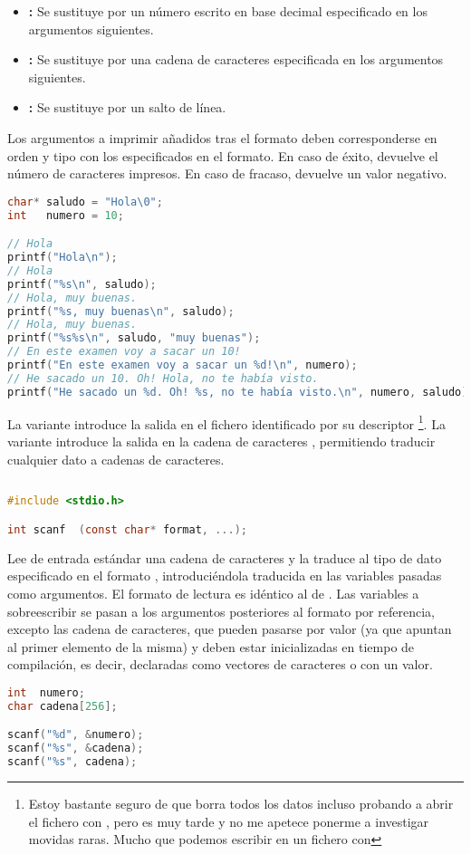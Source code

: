 \begin{itemize}
	\item{}\textbf{:} Se sustituye por un número escrito en base decimal especificado en los argumentos siguientes.
	\item{}\textbf{:} Se sustituye por una cadena de caracteres especificada en los argumentos siguientes.
	\item{}\textbf{:} Se sustituye por un salto de línea.
\end{itemize}

Los argumentos a imprimir añadidos tras el formato deben corresponderse en orden y tipo con los especificados en el formato.
En caso de éxito, devuelve el número de caracteres impresos.
En caso de fracaso, devuelve un valor negativo.

\begin{lstlisting}[language=C]
char* saludo = "Hola\0";
int   numero = 10;

// Hola
printf("Hola\n");
// Hola
printf("%s\n", saludo);
// Hola, muy buenas.
printf("%s, muy buenas\n", saludo);
// Hola, muy buenas.
printf("%s%s\n", saludo, "muy buenas");
// En este examen voy a sacar un 10!
printf("En este examen voy a sacar un %d!\n", numero);
// He sacado un 10. Oh! Hola, no te había visto.
printf("He sacado un %d. Oh! %s, no te había visto.\n", numero, saludo);
\end{lstlisting}

La variante  introduce la salida en el fichero identificado por su descriptor \footnote{Estoy bastante seguro de que borra todos los datos incluso probando a abrir el fichero con , pero es muy tarde y no me apetece ponerme a investigar movidas raras. Mucho que podemos escribir en un fichero con }.
La variante  introduce la salida en la cadena de caracteres , permitiendo traducir cualquier dato a cadenas de caracteres.

\subsection{}

\begin{lstlisting}[language=C]
#include <stdio.h>

int scanf  (const char* format, ...);
\end{lstlisting}

Lee de entrada estándar una cadena de caracteres y la traduce al tipo de dato especificado en el formato , introduciéndola traducida en las variables pasadas como argumentos.
El formato de lectura es idéntico al de .
Las variables a sobreescribir se pasan a los argumentos posteriores al formato por referencia, excepto las cadena de caracteres, que pueden pasarse por valor (ya que apuntan al primer elemento de la misma) y deben estar inicializadas en tiempo de compilación, es decir, declaradas como vectores de caracteres o con un valor.

\begin{lstlisting}[language=C]
int  numero;
char cadena[256];

scanf("%d", &numero);
scanf("%s", &cadena);
scanf("%s", cadena);
\end{lstlisting}

